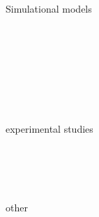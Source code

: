 \documentclass{article}
\begin{document}
Simulational models \\
\noindent
\cite{chate2008modeling} \\
\cite{grossmann2013self} \\
\cite{barberis2016large} \\
\cite{mijalkov2016engineering} \\
\cite{volpe2016effective} \\
\cite{matsui2017noise} \\
\cite{cambui2017finite} \\
\cite{nilsson2017metastable}

experimental studies \\
\noindent
\cite{czirok1996formation} \\
\cite{palacci2013living} \\
\cite{theurkauff2012dynamic} \\
\cite{ginot2015nonequilibrium} \\
\cite{morin2017distortion}

other \\
\noindent
\cite{buhl2006disorder}
\end{document}
